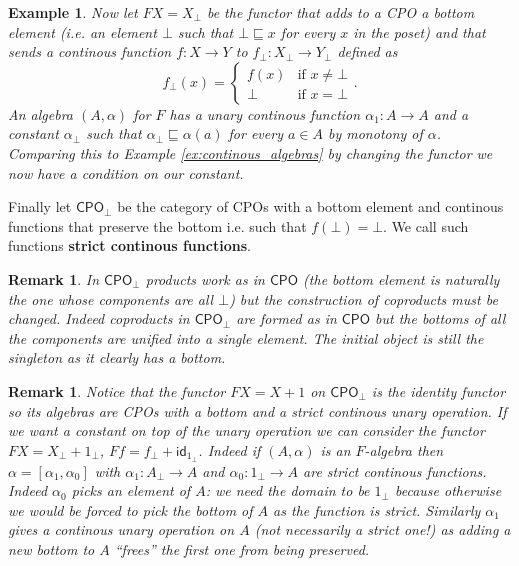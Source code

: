 \documentclass[letterpaper, 11pt, oneside]{memoir}
\theoremstyle{myteo}
\newtheorem{example}[theorem]{Example}
\newtheorem{remark}[theorem]{Remark}
\numberwithin{equation}{section}
\newcommand{\marginnote}[1]{\marginpar{\footnotesize #1}}
\newcommand{\id}{\textsf{id}}
\newcommand{\CPO}{\textsf{CPO}}
\newcommand{\outofcoprod}[2]{{[#1, #2]}}
\begin{document}
\begin{example}
  Now let \(FX = X_\bot\) be the functor that adds to a CPO a bottom element (i.e. an element \(\bot\) such that \(\bot \sqsubseteq x\) for every \(x\) in the poset) and that sends a continous function \(f \colon X \to Y\) to \(f_\bot \colon X_\bot \to Y_\bot\) defined as
  \begin{equation*}
    f_\bot(x) = \begin{cases}
      f(x) & \text{if \(x \neq \bot\)}\\
      \bot & \text{if \(x = \bot\)}
    \end{cases}.
  \end{equation*}
  An algebra \((A, \alpha)\) for \(F\) has a unary continous function \(\alpha_1 \colon A \to A\) and a constant \(\alpha_\bot\) such that \(\alpha_\bot \sqsubseteq \alpha(a)\) for every \(a \in A\) by monotony of \(\alpha\).
  Comparing this to Example \ref{ex:continous_algebras} by changing the functor we now have a condition on our constant.
\end{example}

Finally let \(\CPO_\bot\) be the category of CPOs with a bottom element and continous functions that preserve the bottom i.e. such that \(f(\bot) = \bot\).
\marginnote{strict continous function}
We call such functions \textbf{strict continous functions}.

\begin{remark}
  In \(\CPO_\bot\) products work as in \(\CPO\) (the bottom element is naturally the one whose components are all \(\bot\)) but the construction of coproducts must be changed.
  Indeed coproducts in \(\CPO_\bot\) are formed as in \(\CPO\) but the bottoms of all the components are unified into a single element.
  The initial object is still the singleton as it clearly has a bottom.
\end{remark}

\begin{remark}
  Notice that the functor \(FX = X + 1\) on \(\CPO_\bot\) is the identity functor so its algebras are CPOs with a bottom and a strict continous unary operation.
  If we want a constant on top of the unary operation we can consider the functor \(FX = X_\bot + 1_\bot\), \(Ff = f_\bot + \id_{1_\bot}\).
  Indeed if \((A, \alpha)\) is an \(F\)-algebra then \(\alpha = \outofcoprod{\alpha_1}{\alpha_0}\) with \(\alpha_1 \colon A_\bot \to A\) and \(\alpha_0 \colon 1_\bot \to A\) are strict continous functions.
    Indeed \(\alpha_0\) picks an element of \(A\): we need the domain to be \(1_\bot\) because otherwise we would be forced to pick the bottom of \(A\) as the function is strict.
    Similarly \(\alpha_1\) gives a continous unary operation on \(A\) (not necessarily a strict one!) as adding a new bottom to \(A\) ``frees'' the first one from being preserved.
\end{remark}
\end{document}
